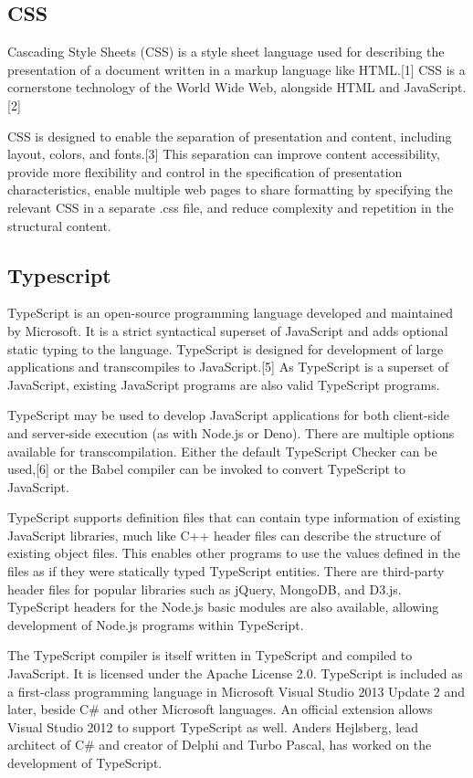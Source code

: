\subsection{CSS}
Cascading Style Sheets (CSS) is a style sheet language used for describing the presentation of a document written in a markup language like HTML.[1] CSS is a cornerstone technology of the World Wide Web, alongside HTML and JavaScript.[2]

CSS is designed to enable the separation of presentation and content, including layout, colors, and fonts.[3] This separation can improve content accessibility, provide more flexibility and control in the specification of presentation characteristics, enable multiple web pages to share formatting by specifying the relevant CSS in a separate .css file, and reduce complexity and repetition in the structural content.


\subsection{Typescript}
TypeScript is an open-source programming language developed and maintained by Microsoft. It is a strict syntactical superset of JavaScript and adds optional static typing to the language. TypeScript is designed for development of large applications and transcompiles to JavaScript.[5] As TypeScript is a superset of JavaScript, existing JavaScript programs are also valid TypeScript programs.

TypeScript may be used to develop JavaScript applications for both client-side and server-side execution (as with Node.js or Deno). There are multiple options available for transcompilation. Either the default TypeScript Checker can be used,[6] or the Babel compiler can be invoked to convert TypeScript to JavaScript.

TypeScript supports definition files that can contain type information of existing JavaScript libraries, much like C++ header files can describe the structure of existing object files. This enables other programs to use the values defined in the files as if they were statically typed TypeScript entities. There are third-party header files for popular libraries such as jQuery, MongoDB, and D3.js. TypeScript headers for the Node.js basic modules are also available, allowing development of Node.js programs within TypeScript.

The TypeScript compiler is itself written in TypeScript and compiled to JavaScript. It is licensed under the Apache License 2.0. TypeScript is included as a first-class programming language in Microsoft Visual Studio 2013 Update 2 and later, beside C\# and other Microsoft languages. An official extension allows Visual Studio 2012 to support TypeScript as well. Anders Hejlsberg, lead architect of C\# and creator of Delphi and Turbo Pascal, has worked on the development of TypeScript.



